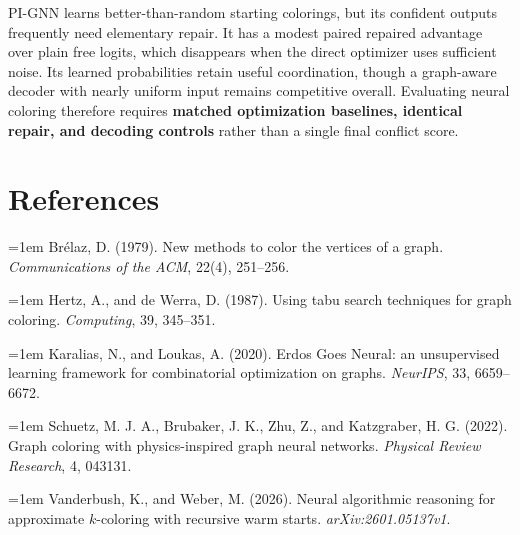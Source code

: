 \documentclass[11pt,letterpaper,twocolumn]{article}
\begin{document}
PI-GNN learns better-than-random starting colorings, but its confident outputs frequently need elementary repair. It has a modest paired repaired advantage over plain free logits, which disappears when the direct optimizer uses sufficient noise. Its learned probabilities retain useful coordination, though a graph-aware decoder with nearly uniform input remains competitive overall. Evaluating neural coloring therefore requires \textbf{matched optimization baselines, identical repair, and decoding controls} rather than a single final conflict score.

\clearpage
\section*{References}
\begingroup\small
\noindent\hangindent=1em
Br\'elaz, D. (1979). New methods to color the vertices of a graph. \emph{Communications of the ACM}, 22(4), 251--256.\par\vspace{5pt}
\noindent\hangindent=1em
Hertz, A., and de Werra, D. (1987). Using tabu search techniques for graph coloring. \emph{Computing}, 39, 345--351.\par\vspace{5pt}
\noindent\hangindent=1em
Karalias, N., and Loukas, A. (2020). Erdos Goes Neural: an unsupervised learning framework for combinatorial optimization on graphs. \emph{NeurIPS}, 33, 6659--6672.\par\vspace{5pt}
\noindent\hangindent=1em
Schuetz, M. J. A., Brubaker, J. K., Zhu, Z., and Katzgraber, H. G. (2022). Graph coloring with physics-inspired graph neural networks. \emph{Physical Review Research}, 4, 043131.\par\vspace{5pt}
\noindent\hangindent=1em
Vanderbush, K., and Weber, M. (2026). Neural algorithmic reasoning for approximate $k$-coloring with recursive warm starts. \emph{arXiv:2601.05137v1}.\par
\endgroup
\end{document}

